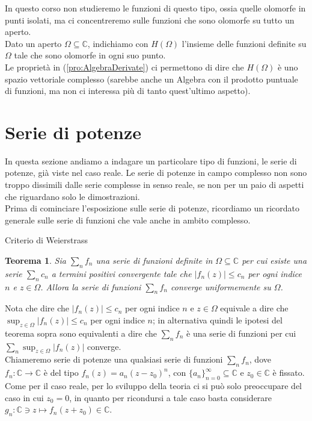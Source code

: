 \documentclass[11pt]{book}
\theoremstyle{Definizione}
\theoremstyle{TeoremaProposizioneLemmaCorollarioCongettura}
\newtheorem{myteo}{Teorema}[section]
\theoremstyle{OsservazioneNotaEsempio}
\newcommand{\C}{\mathbb{C}}
\begin{document}
In questo corso non studieremo le funzioni di questo tipo, ossia quelle olomorfe in punti isolati, ma ci concentreremo sulle funzioni che sono olomorfe su tutto un aperto.\\
Dato un aperto $\Omega\subseteq \C$, indichiamo con $H(\Omega)$ l'insieme delle funzioni definite su $\Omega$ tale che sono olomorfe in ogni suo punto.\\
Le proprietà in (\ref{pro:AlgebraDerivate}) ci permettono di dire che $H(\Omega)$ è uno spazio vettoriale complesso (sarebbe anche un Algebra con il prodotto puntuale di funzioni, ma non ci interessa più di tanto quest'ultimo aspetto).
\section{Serie di potenze}
In questa sezione andiamo a indagare un particolare tipo di funzioni, le serie di potenze, già viste nel caso reale.
Le serie di potenze in campo complesso non sono troppo dissimili dalle serie complesse in senso reale, se non per un paio di aspetti che riguardano solo le dimostrazioni.\\
\indent
Prima di cominciare l'esposizione sulle serie di potenze, ricordiamo un ricordato generale sulle serie di funzioni che vale anche in ambito complesso.
\begin{boxteo}{Criterio di Weierstrass}
\begin{myteo}
Sia $\sum_n f_n$ una serie di funzioni definite in $\Omega\subseteq \C$ per cui esiste una serie $\sum_n c_n$ a termini positivi convergente tale che $|f_n(z)| \leq c_n$ per ogni indice $n$ e $z\in \Omega$. Allora la serie di funzioni $\sum_{n} f_n$ converge uniformemente su $\Omega$.
\end{myteo}
\end{boxteo}
\noindent
Nota che dire che $|f_n(z)| \leq c_n$ per ogni indice $n$ e $z\in \Omega$ equivale a dire che $\sup_{z\in \Omega} |f_n(z)| \leq c_n$ per ogni indice $n$; in alternativa quindi le ipotesi del teorema sopra sono equivalenti a dire che $\sum_n f_n$ è una serie di funzioni per cui $\sum_n \sup_{z\in \Omega} |f_n(z)|$ converge.\\
\indent
Chiameremo serie di potenze una qualsiasi serie di funzioni $\sum_n f_n$, dove $f_n:\C\longrightarrow \C$ è del tipo $f_n(z) = a_n (z-z_0)^n$, con $\{a_n\}_{n = 0}^\infty\subseteq \C$ e $z_0\in \C$ è fissato. Come per il caso reale, per lo sviluppo della teoria ci si può solo preoccupare del caso in cui $z_0 = 0$, in quanto per ricondursi a tale caso basta considerare $g_n: \C \ni z \longmapsto f_n(z+z_0)\in \C$.
\end{document}

